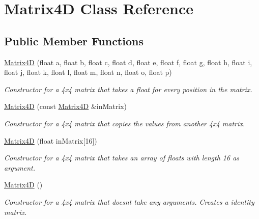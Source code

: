 \hypertarget{class_matrix4_d}{}\section{Matrix4D Class Reference}
\label{class_matrix4_d}
\subsection*{Public Member Functions}
\begin{DoxyCompactItemize}
\item 
\mbox{\label{class_matrix4_d_a285072f77f19258810415ba8ed82fdf7}} 
\mbox{\hyperlink{class_matrix4_d_a285072f77f19258810415ba8ed82fdf7}{Matrix4D}} (float a, float b, float c, float d, float e, float f, float g, float h, float i, float j, float k, float l, float m, float n, float o, float p)
\begin{DoxyCompactList}\small\item\em Constructor for a 4x4 matrix that takes a float for every position in the matrix. \end{DoxyCompactList}\item 
\mbox{\label{class_matrix4_d_a9388cb49f48eb79d33f4e8b3d5b97b67}} 
\mbox{\hyperlink{class_matrix4_d_a9388cb49f48eb79d33f4e8b3d5b97b67}{Matrix4D}} (const \mbox{\hyperlink{class_matrix4_d}{Matrix4D}} \&in\+Matrix)
\begin{DoxyCompactList}\small\item\em Constructor for a 4x4 matrix that copies the values from another 4x4 matrix. \end{DoxyCompactList}\item 
\mbox{\label{class_matrix4_d_a4d8448d53a6f772bbf1793c38ccfd790}} 
\mbox{\hyperlink{class_matrix4_d_a4d8448d53a6f772bbf1793c38ccfd790}{Matrix4D}} (float in\+Matrix\mbox{[}16\mbox{]})
\begin{DoxyCompactList}\small\item\em Constructor for a 4x4 matrix that takes an array of floats with length 16 as argument. \end{DoxyCompactList}\item 
\mbox{\label{class_matrix4_d_a7cecf058dd181984d8ca7fee1423c6e2}} 
\mbox{\hyperlink{class_matrix4_d_a7cecf058dd181984d8ca7fee1423c6e2}{Matrix4D}} ()
\begin{DoxyCompactList}\small\item\em Constructor for a 4x4 matrix that doesnt take any arguments. Creates a identity matrix. \end{DoxyCompactList}\item 

\end{DoxyCompactItemize}
